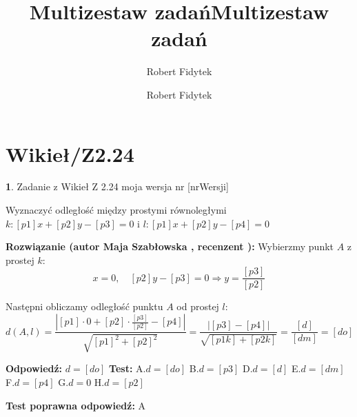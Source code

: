 \documentclass[12pt, a4paper]{article}
\title{Multizestaw zadań}
\author{Robert Fidytek}
\date{}\documentclass[12pt, a4paper]{article}
\title{Multizestaw zadań}
\author{Robert Fidytek}
\date{}
\theoremstyle{definition} %
\newtheorem{zad}{}
\theoremstyle{definition} %
\newtheorem{zad}{}
\newcommand{\kategoria}[1]{\section{#1}} %
\newcommand{\zadStart}[1]{\begin{zad}#1\newline} %
\newcommand{\zadStop}{\end{zad}}   %
\newcommand{\rozwStart}[2]{\noindent \textbf{Rozwiązanie (autor #1 , recenzent #2): }\newline} %
\newcommand{\rozwStop}{\newline}                                            %
\newcommand{\odpStart}{\noindent \textbf{Odpowiedź:}\newline}    %
\newcommand{\odpStop}{\newline}                                             %
\newcommand{\testStart}{\noindent \textbf{Test:}\newline} %
\newcommand{\testStop}{\newline} %
\newcommand{\kluczStart}{\noindent \textbf{Test poprawna odpowiedź:}\newline} %
\newcommand{\kluczStop}{\newline} %
\begin{document}
\maketitle


\kategoria{Wikieł/Z2.24}
\zadStart{Zadanie z Wikieł Z 2.24  moja wersja nr [nrWersji]}


Wyznaczyć odległość między prostymi równoległymi $k:[p1]x+[p2]y-[p3]=0$ i $l:[p1]x+[p2]y-[p4]=0$
\zadStop

\rozwStart{Maja Szabłowska}{}
Wybierzmy punkt $A$ z prostej $k$:
$$x=0, \quad [p2]y-[p3]=0 \Rightarrow y=\frac{[p3]}{[p2]}$$

Następni obliczamy odległość punktu $A$ od prostej $l$:
$$d(A,l)=\frac{|[p1]\cdot0+[p2]\cdot\frac{[p3]}{[p2]}-[p4]|}{\sqrt{[p1]^{2}+[p2]^{2}}}=\frac{|[p3]-[p4]|}{\sqrt{[p1k]+[p2k]}}=\frac{[d]}{[dm]}=[do]$$
\rozwStop


\odpStart
$d=[do]$
\odpStop
\testStart
A.$d=[do]$
B.$d=[p3]$
D.$d=[d]$
E.$d=[dm]$
F.$d=[p4]$
G.$d=0$
H.$d=[p2]$

\testStop
\kluczStart
A
\kluczStop
\end{document}
